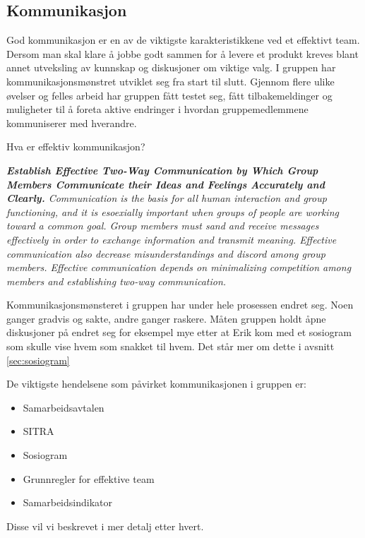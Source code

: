 \subsection{Kommunikasjon}


God kommunikasjon er en av de viktigste karakteristikkene ved et effektivt team.
Dersom man skal klare å jobbe godt sammen for å levere et produkt kreves blant annet utveksling av kunnskap og diskusjoner om viktige valg.
I gruppen har kommunikasjonsmønstret utviklet seg fra start til slutt.
Gjennom flere ulike øvelser og felles arbeid har gruppen fått testet seg, fått tilbakemeldinger og muligheter til å foreta aktive endringer i hvordan gruppemedlemmene kommuniserer med hverandre.

Hva er effektiv kommunikasjon?

\textit{
\textbf{
Establish Effective Two-Way Communication by Which Group Members Communicate their Ideas and Feelings Accurately and Clearly.
}
Communication is the basis for all human interaction and group functioning, and it is esoexially important when groups of people are working toward a common goal.
Group members must sand and receive messages effectively in order to exchange information and transmit meaning.
Effective communication also decrease misunderstandings and discord among group members.
Effective communication depends on minimalizing competition among members and establishing two-way communication.
}
\cite{group_dynamics}

Kommunikasjonsmønsteret i gruppen har under hele prosessen endret seg.
Noen ganger gradvis og sakte, andre ganger raskere.
Måten gruppen holdt åpne diskusjoner på endret seg for eksempel mye etter at Erik kom med et sosiogram som skulle vise hvem som snakket til hvem.
Det står mer om dette i avsnitt \ref{sec:sosiogram}

De viktigste hendelsene som påvirket kommunikasjonen i gruppen er:

\begin{itemize}
\item Samarbeidsavtalen
\item SITRA
\item Sosiogram
\item Grunnregler for effektive team
\item Samarbeidsindikator
\end{itemize}
Disse vil vi beskrevet i mer detalj etter hvert.

